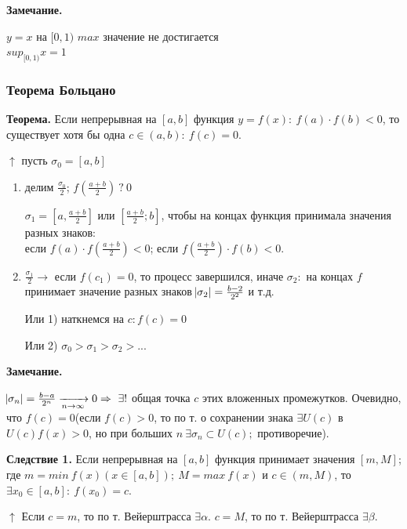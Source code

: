 \documentclass{article}
\begin{document}
    \textbf{Замечание.} 

    \( y = x \) на \( [0, 1) \) \( max \) значение не достигается\\
    \( sup_{[0, 1)} x = 1 \)


    \subsubsection{Теорема Больцано}
    \textbf{Теорема.} Если непрерывная на \([a, b]\) функция \(y = f(x):\ f(a) \cdot f(b) < 0\), то существует хотя бы одна \(c \in (a, b):\ f(c) = 0\).

    \( \uparrow \) пусть \( \sigma_0 = [a, b] \)

    \begin{enumerate}
        \item делим \( \frac{\sigma_0}{2} \); \( f(\frac{a + b}{2})\ ?\ 0 \)
        
        \( \sigma_1 = [a, \frac{a + b}{2}] \) или \( [\frac{a + b}{2}; b] \), чтобы на концах функция принимала значения разных знаков:\\
        если \(f(a) \cdot f(\frac{a+b}{2}) < 0\); если \(f(\frac{a+b}{2}) \cdot f(b) < 0\).
        
        \item \( \frac{\sigma_1}{2} \rightarrow \) если \(f(c_1) = 0\), то процесс завершился, иначе \(\sigma_2:\) на концах \(f\) принимает значение разных знаков \( \abs{\sigma_2} = \frac{b - 2}{2^2} \) и т.д. 
        
        Или 1) наткнемся на \( c: f(c) = 0 \)
        
        Или 2) \( \sigma_0 > \sigma_1 > \sigma_2 > ... \)
    \end{enumerate}
    
    \textbf{Замечание.}

    \(\abs{\sigma_n} = \frac{b-a}{2^n} \xrightarrow[n \rightarrow \infty]{} 0 \Rightarrow\ \exists !\) общая точка \(c\) этих вложенных промежутков. Очевидно, что \(f(c) = 0\)(если \(f(c) > 0\), то по т. о сохранении знака \(\exists U(c)\) в \(U(c) f(x) > 0\), но при больших \(n\ \exists \sigma_n \subset U(c);\) противоречие).

    \textbf{Следствие 1.} Если непрерывная на \([a, b]\) функция принимает значения \([m, M]\); где \(m = min\ f(x)(x \in [a, b]);\ M = max\ f(x)\) и \(c \in (m, M)\), то \(\exists x_0 \in [a,b]:\ f(x_0) = c\).
    
    \( \uparrow \) Если \( c = m \), то по т. Вейерштрасса \( \exists \alpha \). \( c = M \), то по т. Вейерштрасса \( \exists \beta \).
\end{document}
